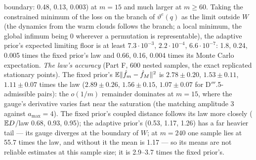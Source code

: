 boundary: 0.48, 0.13, 0.003) at $m = 15$ and much larger at $m\ge60$. Taking the constrained minimum of the loss on the
branch of $\vartheta^e(q)$ as the limit outside $W$ (the dynamics from the warm clouds follows the branch; a local
minimum, the global infimum being 0 wherever a permutation is representable), the adaptive prior's expected limiting
floor is at least $7.3\cdot10^{-3}$, $2.2\cdot10^{-4}$, $6.6\cdot10^{-7}$: 1.8, 0.24, 0.005 times the fixed prior's law
and 0.66, 0.16, 0.004 times its Monte Carlo expectation. \emph{The law's accuracy} (Part F, 600 nested samples, the
exact replicated stationary points). The fixed prior's $\mathbb{E}\lVert \hat f_m - \hat f_M\rVert^2$ is $2.78\pm0.20$,
$1.53\pm0.11$, $1.11\pm0.07$ times the law ($2.89\pm0.26$, $1.56\pm0.15$, $1.07\pm0.07$ for D$'''$.5-admissible
pairs): the $o(1/m)$ remainder dominates at $m = 15$, where the gauge's derivative varies fast near the saturation
(the matching amplitude 3 against $a_{\max} = 4$). The fixed prior's coupled distance follows its law more closely
($\mathbb{E} D$/law 0.68, 0.93, 0.95); the adaptive prior's (0.53, 1.17, 1.26) has a far heavier tail --- its gauge diverges
at the boundary of $W$; at $m = 240$ one sample lies at 55.7 times the law, and without it the mean is 1.17 --- so its
means are not reliable estimates at this sample size; it is 2.9--3.7 times the fixed prior's.

